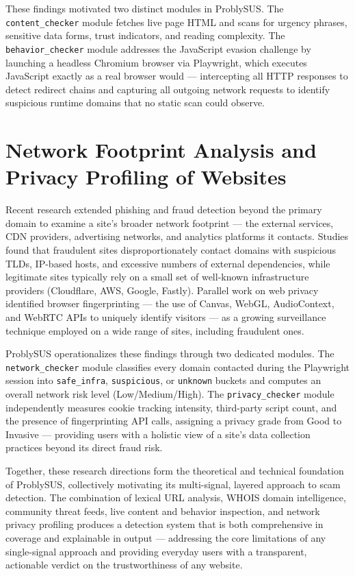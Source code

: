 These findings motivated two distinct modules in ProblySUS. The \texttt{content\_checker} module fetches live page HTML and scans for urgency phrases, sensitive data forms, trust indicators, and reading complexity. The \texttt{behavior\_checker} module addresses the JavaScript evasion challenge by launching a headless Chromium browser via Playwright, which executes JavaScript exactly as a real browser would — intercepting all HTTP responses to detect redirect chains and capturing all outgoing network requests to identify suspicious runtime domains that no static scan could observe.

\section{Network Footprint Analysis and Privacy Profiling of Websites}

Recent research extended phishing and fraud detection beyond the primary domain to examine a site's broader network footprint — the external services, CDN providers, advertising networks, and analytics platforms it contacts. Studies found that fraudulent sites disproportionately contact domains with suspicious TLDs, IP-based hosts, and excessive numbers of external dependencies, while legitimate sites typically rely on a small set of well-known infrastructure providers (Cloudflare, AWS, Google, Fastly). Parallel work on web privacy identified browser fingerprinting — the use of Canvas, WebGL, AudioContext, and WebRTC APIs to uniquely identify visitors — as a growing surveillance technique employed on a wide range of sites, including fraudulent ones.

ProblySUS operationalizes these findings through two dedicated modules. The \texttt{network\_checker} module classifies every domain contacted during the Playwright session into \texttt{safe\_infra}, \texttt{suspicious}, or \texttt{unknown} buckets and computes an overall network risk level (Low/Medium/High). The \texttt{privacy\_checker} module independently measures cookie tracking intensity, third-party script count, and the presence of fingerprinting API calls, assigning a privacy grade from Good to Invasive — providing users with a holistic view of a site's data collection practices beyond its direct fraud risk.

Together, these research directions form the theoretical and technical foundation of ProblySUS, collectively motivating its multi-signal, layered approach to scam detection. The combination of lexical URL analysis, WHOIS domain intelligence, community threat feeds, live content and behavior inspection, and network privacy profiling produces a detection system that is both comprehensive in coverage and explainable in output — addressing the core limitations of any single-signal approach and providing everyday users with a transparent, actionable verdict on the trustworthiness of any website.